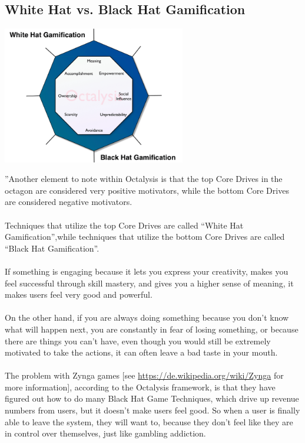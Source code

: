 \subsection{White Hat vs. Black Hat Gamification}
\begin{center}
    \includegraphics[width=0.6\textwidth]{images/white-hat-vs-black-hat-gamification.png}
\end{center}
''Another element to note within Octalysis is that the top Core Drives in the octagon are considered very positive motivators, while the bottom Core Drives are considered negative motivators.\\
\\
Techniques that utilize the top Core Drives are called “White Hat Gamification”,while techniques that utilize the bottom Core Drives are called “Black Hat Gamification”.\\
\\
If something is engaging because it lets you express your creativity, makes you feel successful through skill mastery, and gives you a higher sense of meaning, it makes users feel very good and powerful.\\
\\
On the other hand, if you are always doing something because you don’t know what will happen next, you are constantly in fear of losing something, or because there are things you can’t have, even though you would still be extremely motivated to take the actions, it can often leave a bad taste in your mouth.\\
\\
The problem with Zynga games [see \url{https://de.wikipedia.org/wiki/Zynga} for more information], according to the Octalysis framework, is that they have figured out how to do many Black Hat Game Techniques, which drive up revenue numbers from users, but it doesn’t make users feel good. So when a user is finally able to leave the system, they will want to, because they don’t feel like they are in control over themselves, just like gambling addiction.\\
